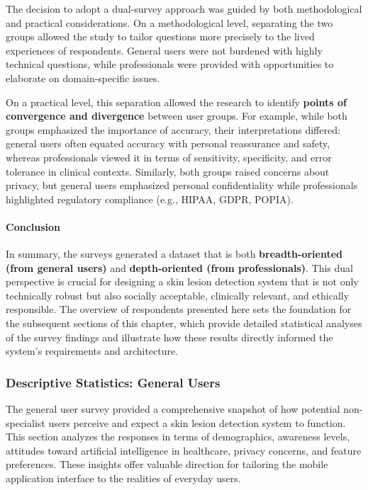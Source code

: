 \documentclass[
  12pt,
  oneside]{article}
\begin{document}
The decision to adopt a dual-survey approach was guided by both
methodological and practical considerations. On a methodological level,
separating the two groups allowed the study to tailor questions more
precisely to the lived experiences of respondents. General users were
not burdened with highly technical questions, while professionals were
provided with opportunities to elaborate on domain-specific issues.

On a practical level, this separation allowed the research to identify
\textbf{points of convergence and divergence} between user groups. For
example, while both groups emphasized the importance of accuracy, their
interpretations differed: general users often equated accuracy with
personal reassurance and safety, whereas professionals viewed it in
terms of sensitivity, specificity, and error tolerance in clinical
contexts. Similarly, both groups raised concerns about privacy, but
general users emphasized personal confidentiality while professionals
highlighted regulatory compliance (e.g., HIPAA, GDPR, POPIA).

\paragraph{Conclusion}\label{conclusion-2}

In summary, the surveys generated a dataset that is both
\textbf{breadth-oriented (from general users)} and
\textbf{depth-oriented (from professionals)}. This dual perspective is
crucial for designing a skin lesion detection system that is not only
technically robust but also socially acceptable, clinically relevant,
and ethically responsible. The overview of respondents presented here
sets the foundation for the subsequent sections of this chapter, which
provide detailed statistical analyses of the survey findings and
illustrate how these results directly informed the system's requirements
and architecture.

\subsubsection{Descriptive Statistics: General
Users}\label{descriptive-statistics-general-users}

The general user survey provided a comprehensive snapshot of how
potential non-specialist users perceive and expect a skin lesion
detection system to function. This section analyzes the responses in
terms of demographics, awareness levels, attitudes toward artificial
intelligence in healthcare, privacy concerns, and feature preferences.
These insights offer valuable direction for tailoring the mobile
application interface to the realities of everyday users.
\end{document}
